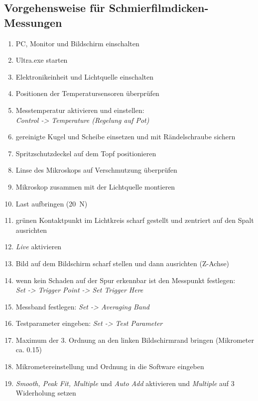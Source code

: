 \begin{appendices}
    \section{Vorgehensweise für Schmierfilmdicken-Messungen}
        \begin{enumerate}
            \item PC, Monitor und Bildschirm einschalten
            \item Ultra.exe starten
            \item Elektronikeinheit und Lichtquelle einschalten
            \item Positionen der Temperatursensoren überprüfen
            \item Messtemperatur aktivieren und einstellen: \\
                \textit{Control -> Temperature (Regelung auf Pot)}
            \item gereinigte Kugel und Scheibe einsetzen und mit Rändelschraube sichern
            \item Spritzschutzdeckel auf dem Topf positionieren
            \item Linse des Mikroskops auf Verschmutzung überprüfen
            \item Mikroskop zusammen mit der Lichtquelle montieren
            \item Last aufbringen (\SI{20}{\newton})
            \item grünen Kontaktpunkt im Lichtkreis scharf gestellt und zentriert auf den Spalt ausrichten
            \item \textit{Live} aktivieren
            \item Bild auf dem Bildschirm scharf stellen und dann ausrichten (Z-Achse)
            \item wenn kein Schaden auf der Spur erkennbar ist den Messpunkt festlegen: \\
                \textit{Set -> Trigger Point -> Set Trigger Here}
            \item Messband festlegen: \textit{Set -> Averaging Band}
            \item Testparameter eingeben: \textit{Set -> Test Parameter}
            \item Maximum der 3. Ordnung an den linken Bildschirmrand bringen (Mikrometer ca. \num{0.15})
            \item Mikrometereinstellung und Ordnung in die Software eingeben
            \item \textit{Smooth, Peak Fit, Multiple} und \textit{Auto Add} aktivieren und \textit{Multiple} auf \num{3} Widerholung setzen

\end{enumerate}
\end{appendices}
